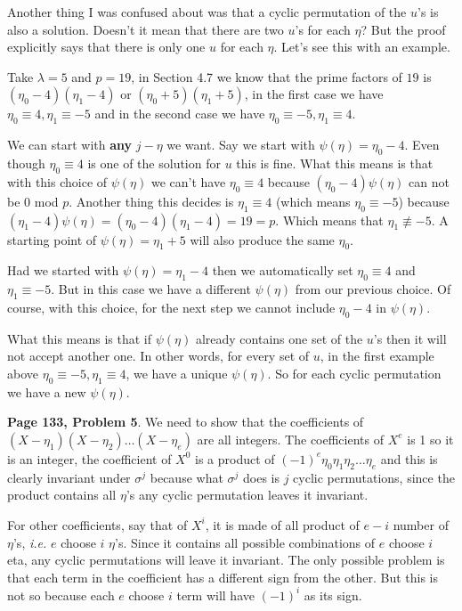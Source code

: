 \documentclass[aps,preprint,preprintnumbers,nofootinbib,showpacs,prd]{revtex4-1}
\newcommand{\ie}{{\it i.e.} }
\begin{document}
Another thing I was confused about was that a cyclic permutation of the $u$'s is also a solution. Doesn't it mean that there are two $u$'s for each $\eta$? But the proof explicitly says that there is only one $u$ for each $\eta$. Let's see this with an example.

Take $\lambda = 5$ and $p = 19$, in Section 4.7 we know that the prime factors of $19$ is $(\eta_0 - 4)(\eta_1 - 4)$ or $(\eta_0 + 5)(\eta_1 + 5)$, in the first case we have $\eta_0 \equiv 4, \eta_1 \equiv -5$ and in the second case we have $\eta_0 \equiv -5, \eta_1 \equiv 4$.

We can start with {\bf any} $j - \eta$ we want. Say we start with $\psi(\eta) = \eta_0 - 4$. Even though $\eta_0 \equiv 4$ is one of the solution for $u$ this is fine. What this means is that with this choice of $\psi(\eta)$ we can't have $\eta_0 \equiv 4$ because $(\eta_0 - 4)\psi(\eta)$ can not be 0 mod $p$. Another thing this decides is $\eta_1 \equiv 4$ (which means $\eta_0 \equiv -5$) because $(\eta_1 - 4)\psi(\eta) = (\eta_0 - 4)(\eta_1 - 4) = 19 = p$. Which means that $\eta_1 \not\equiv -5$. A starting point of $\psi(\eta) = \eta_1 + 5$ will also produce the same $\eta_0$.

Had we started with $\psi(\eta) = \eta_1 - 4$ then we automatically set $\eta_0 \equiv 4$ and $\eta_1 \equiv -5$. But in this case we have a different $\psi(\eta)$ from our previous choice. Of course, with this choice, for the next step we cannot include $\eta_0 - 4$ in $\psi(\eta)$.

What this means is that if $\psi(\eta)$ already contains one set of the $u$'s then it will not accept another one. In other words, for every set of $u$, in the first example above $\eta_0 \equiv -5, \eta_1 \equiv 4$, we have a unique $\psi(\eta)$. So for each cyclic permutation we have a new $\psi(\eta)$.


{\bf Page 133, Problem 5}. We need to show that the coefficients of $(X - \eta_1)(X - \eta_2) \dots (X - \eta_e)$ are all integers. The coefficients of $X^e$ is 1 so it is an integer, the coefficient of $X^0$ is a product of $(-1)^e\eta_0\eta_1\eta_2 \dots \eta_e$ and this is clearly invariant under $\sigma^j$ because what $\sigma^j$ does is $j$ cyclic permutations, since the product contains all $\eta$'s any cyclic permutation leaves it invariant.

For other coefficients, say that of $X^i$, it is made of all product of $e - i$ number of $\eta$'s, \ie $e$ choose $i$ $\eta$'s. Since it contains all possible combinations of $e$ choose $i$ eta, any cyclic permutations will leave it invariant. The only possible problem is that each term in the coefficient has a different sign from the other. But this is not so because each $e$ choose $i$ term will have $(-1)^i$ as its sign.
\end{document}
